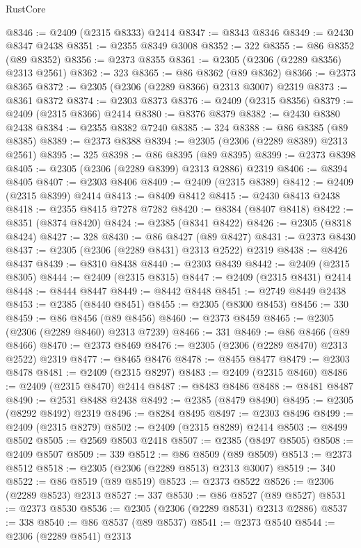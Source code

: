 \begin{lexlean}{RustCore}
\begin{coremodule}
@8346 := @2409 (@2315 @8333) @2414
@8347 := @8343 @8346
@8349 := @2430 @8347 @2438
@8351 := @2355 @8349 @3008
@8352 := 322
@8355 := @86 @8352 (@89 @8352)
@8356 := @2373 @8355
@8361 := @2305 (@2306 (@2289 @8356) @2313 @2561)
@8362 := 323
@8365 := @86 @8362 (@89 @8362)
@8366 := @2373 @8365
@8372 := @2305 (@2306 (@2289 @8366) @2313 @3007) @2319
@8373 := @8361 @8372
@8374 := @2303 @8373
@8376 := @2409 (@2315 @8356)
@8379 := @2409 (@2315 @8366) @2414
@8380 := @8376 @8379
@8382 := @2430 @8380 @2438
@8384 := @2355 @8382 @7240
@8385 := 324
@8388 := @86 @8385 (@89 @8385)
@8389 := @2373 @8388
@8394 := @2305 (@2306 (@2289 @8389) @2313 @2561)
@8395 := 325
@8398 := @86 @8395 (@89 @8395)
@8399 := @2373 @8398
@8405 := @2305 (@2306 (@2289 @8399) @2313 @2886) @2319
@8406 := @8394 @8405
@8407 := @2303 @8406
@8409 := @2409 (@2315 @8389)
@8412 := @2409 (@2315 @8399) @2414
@8413 := @8409 @8412
@8415 := @2430 @8413 @2438
@8418 := @2355 @8415 @7278 @7282
@8420 := @8384 (@8407 @8418)
@8422 := @8351 (@8374 @8420)
@8424 := @2385 (@8341 @8422)
@8426 := @2305 (@8318 @8424)
@8427 := 328
@8430 := @86 @8427 (@89 @8427)
@8431 := @2373 @8430
@8437 := @2305 (@2306 (@2289 @8431) @2313 @2522) @2319
@8438 := @8426 @8437
@8439 := @8310 @8438
@8440 := @2303 @8439
@8442 := @2409 (@2315 @8305)
@8444 := @2409 (@2315 @8315)
@8447 := @2409 (@2315 @8431) @2414
@8448 := @8444 @8447
@8449 := @8442 @8448
@8451 := @2749 @8449 @2438
@8453 := @2385 (@8440 @8451)
@8455 := @2305 (@8300 @8453)
@8456 := 330
@8459 := @86 @8456 (@89 @8456)
@8460 := @2373 @8459
@8465 := @2305 (@2306 (@2289 @8460) @2313 @7239)
@8466 := 331
@8469 := @86 @8466 (@89 @8466)
@8470 := @2373 @8469
@8476 := @2305 (@2306 (@2289 @8470) @2313 @2522) @2319
@8477 := @8465 @8476
@8478 := @8455 @8477
@8479 := @2303 @8478
@8481 := @2409 (@2315 @8297)
@8483 := @2409 (@2315 @8460)
@8486 := @2409 (@2315 @8470) @2414
@8487 := @8483 @8486
@8488 := @8481 @8487
@8490 := @2531 @8488 @2438
@8492 := @2385 (@8479 @8490)
@8495 := @2305 (@8292 @8492) @2319
@8496 := @8284 @8495
@8497 := @2303 @8496
@8499 := @2409 (@2315 @8279)
@8502 := @2409 (@2315 @8289) @2414
@8503 := @8499 @8502
@8505 := @2569 @8503 @2418
@8507 := @2385 (@8497 @8505)
@8508 := @2409 @8507
@8509 := 339
@8512 := @86 @8509 (@89 @8509)
@8513 := @2373 @8512
@8518 := @2305 (@2306 (@2289 @8513) @2313 @3007)
@8519 := 340
@8522 := @86 @8519 (@89 @8519)
@8523 := @2373 @8522
@8526 := @2306 (@2289 @8523) @2313
@8527 := 337
@8530 := @86 @8527 (@89 @8527)
@8531 := @2373 @8530
@8536 := @2305 (@2306 (@2289 @8531) @2313 @2886)
@8537 := 338
@8540 := @86 @8537 (@89 @8537)
@8541 := @2373 @8540
@8544 := @2306 (@2289 @8541) @2313

\end{coremodule}
\end{lexlean}
